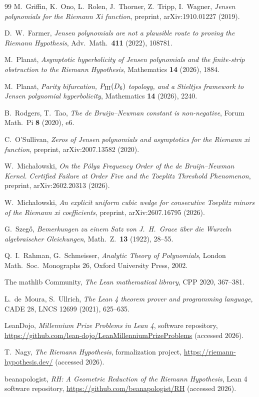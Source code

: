 \documentclass[11pt,a4paper]{article}
\theoremstyle{definition}
\begin{document}
\begin{thebibliography}{99}
 M.~Griffin, K.~Ono, L.~Rolen, J.~Thorner,
Z.~Tripp, I.~Wagner,
\emph{Jensen polynomials for the Riemann Xi function}, preprint,
arXiv:1910.01227 (2019).

 D.~W.~Farmer,
\emph{Jensen polynomials are not a plausible route to proving the Riemann
Hypothesis}, Adv.\ Math.\ \textbf{411} (2022), 108781.

 M.~Planat,
\emph{Asymptotic hyperbolicity of Jensen polynomials and the finite-strip
obstruction to the Riemann Hypothesis}, Mathematics \textbf{14} (2026),
1884.

 M.~Planat,
\emph{Parity bifurcation, $P_{\rm III}(D_6)$ topology, and a Stieltjes
framework to Jensen polynomial hyperbolicity}, Mathematics \textbf{14}
(2026), 2240.

 B.~Rodgers, T.~Tao,
\emph{The de Bruijn--Newman constant is non-negative},
Forum Math.\ Pi \textbf{8} (2020), e6.

 C.~O'Sullivan,
\emph{Zeros of Jensen polynomials and asymptotics for the Riemann xi
function}, preprint, arXiv:2007.13582 (2020).

W.~Micha\l{}owski,
\emph{On the P\'olya Frequency Order of the de Bruijn--Newman Kernel.
Certified Failure at Order Five and the Toeplitz Threshold Phenomenon},
preprint, arXiv:2602.20313 (2026).

W.~Micha\l{}owski,
\emph{An explicit uniform cubic wedge for consecutive Toeplitz minors of the
Riemann xi coefficients}, preprint, arXiv:2607.16795 (2026).

 G.~Szeg\H{o},
\emph{Bemerkungen zu einem Satz von J.~H.~Grace \"uber die Wurzeln
algebraischer Gleichungen}, Math.\ Z.\ \textbf{13} (1922), 28--55.

 Q.~I.~Rahman, G.~Schmeisser,
\emph{Analytic Theory of Polynomials}, London Math.\ Soc.\ Monographs 26,
Oxford University Press, 2002.

 The mathlib Community,
\emph{The Lean mathematical library}, CPP 2020, 367--381.

 L.~de~Moura, S.~Ullrich,
\emph{The Lean 4 theorem prover and programming language},
CADE 28, LNCS 12699 (2021), 625--635.

 LeanDojo,
\emph{Millennium Prize Problems in Lean 4}, software repository,
\url{https://github.com/lean-dojo/LeanMillenniumPrizeProblems} (accessed 2026).

 T.~Nagy,
\emph{The Riemann Hypothesis}, formalization project,
\url{https://riemann-hypothesis.dev/} (accessed 2026).

 beanapologist,
\emph{RH: A Geometric Reduction of the Riemann Hypothesis}, Lean 4 software
repository, \url{https://github.com/beanapologist/RH} (accessed 2026).

\end{thebibliography}
\end{document}
